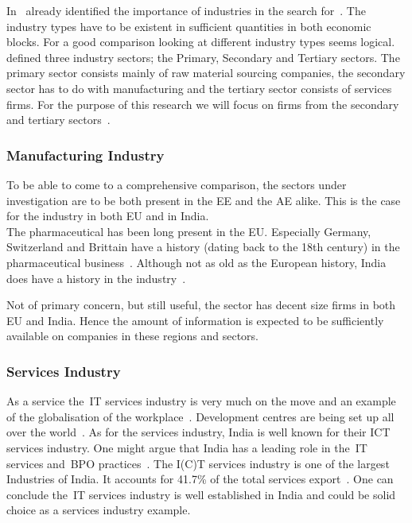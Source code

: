 In~\cite{Porter:1980to} already identified the importance of industries in the search for~\ca. 
The industry types have to be existent in sufficient quantities in both economic blocks.
For a good comparison looking at different industry types seems logical. \\
\cite{Fisher:1939} defined three industry sectors; the Primary, Secondary and Tertiary sectors.
The primary sector consists mainly of raw material sourcing companies, the secondary sector has to do with manufacturing and the tertiary sector consists of services firms.
For the purpose of this research we will focus on firms from the secondary and tertiary sectors~\citep{Fisher:1939}.


\subsubsection{Manufacturing Industry} 

To be able to come to a comprehensive comparison, the sectors under investigation are to be both present in the \gls{EE} and the \gls{AE} alike. 
This is the case for the \pharma industry in both \gls{EU} and in India.\\
The pharmaceutical has been long present in the EU\@. 
Especially Germany, Switzerland and Brittain have a history (dating back to the 18th century) in the pharmaceutical business~\citep{Walsh:2010,Liebenau:1984wb}.
Although not as old as the European history, India does have a history in the \pharma industry~\citep{Mazumdar:2012tx}. 

Not of primary concern, but still useful, the \pharma sector has decent size firms in both \gls{EU} and India.
Hence the amount of information is expected to be sufficiently available on companies in these regions and sectors.


\subsubsection{Services Industry} 

As a service the~\gls{IT} services industry is very much on the move and an example of the globalisation of the workplace~\citep{Reuters:2012}. 
Development centres are being set up all over the world~\citep{Reuters:2012,India-Times:2008}. 
As for the services industry, India is well known for their ICT services industry. 
One might argue that India has a leading role in the~\gls{IT} services and~\gls{BPO} practices~\citep{The-Hindu:2011}. 
The I(C)T services industry is one of the largest Industries of India. 
It accounts for 41.7\% of the total services export~\citep{Government-of-India:2012}.
One can conclude the~\gls{IT} services industry is well established in India and could be solid choice as a services industry example.

